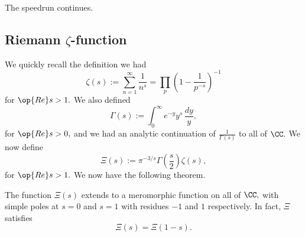 \documentclass[../notes.tex]{subfiles}
\begin{document}














The speed{run} continues.

\subsection{Riemann \texorpdfstring{$\zeta$}{Z}-function}
We quickly recall the definition we had
\[\zeta(s):=\sum_{n=1}^\infty\frac1{n^s}=\prod_p\left(1-\frac1{p^{-s}}\right)^{-1}\]
for $\op{Re}s>1.$ We also defined
\[\Gamma(s):=\int_0^\infty e^{-y}y^s\,\frac{dy}y,\]
for $\op{Re}s>0,$ and we had an analytic continuation of $\frac1{\Gamma(s)}$ to all of $\CC.$ We now define
\[\Xi(s):=\pi^{-3/s}\Gamma\left(\frac s2\right)\zeta(s),\]
for $\op{Re}s>1.$ We now have the following theorem.
\begin{theorem}
	The function $\Xi(s)$ extends to a meromorphic function on all of $\CC,$ with simple poles at $s=0$ and $s=1$ with residues $-1$ and $1$ respectively. In fact, $\Xi$ satisfies
	\[\Xi(s)=\Xi(1-s).\]
\end{theorem}
\end{document}
